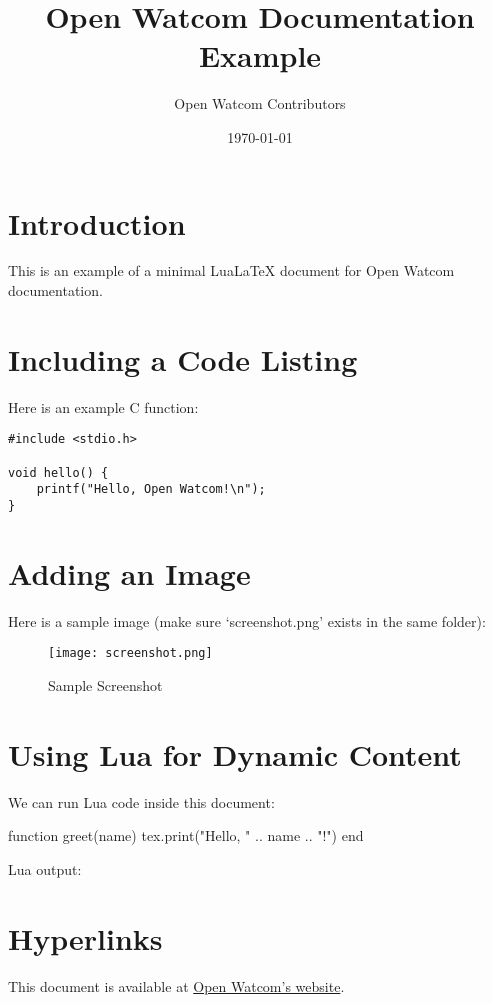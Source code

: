 \documentclass{article}
\begin{document}
\title{Open Watcom Documentation Example}
\author{Open Watcom Contributors}
\date{\today}
\maketitle

\section{Introduction}
This is an example of a minimal LuaLaTeX document for Open Watcom documentation.

\section{Including a Code Listing}
Here is an example C function:

\begin{lstlisting}
#include <stdio.h>

void hello() {
    printf("Hello, Open Watcom!\n");
}
\end{lstlisting}

\section{Adding an Image}
Here is a sample image (make sure `screenshot.png' exists in the same folder):

\begin{figure}[h]
    \centering
    \texttt{[image: screenshot.png]}
    \caption{Sample Screenshot}
    \label{fig:screenshot}
\end{figure}

\section{Using Lua for Dynamic Content}
We can run Lua code inside this document:

\begin{luacode}
  function greet(name)
    tex.print("Hello, " .. name .. "!")
  end
\end{luacode}

\noindent Lua output: 

\section{Hyperlinks}
This document is available at \href{https://www.openwatcom.org}{Open Watcom's website}.
\end{document}
